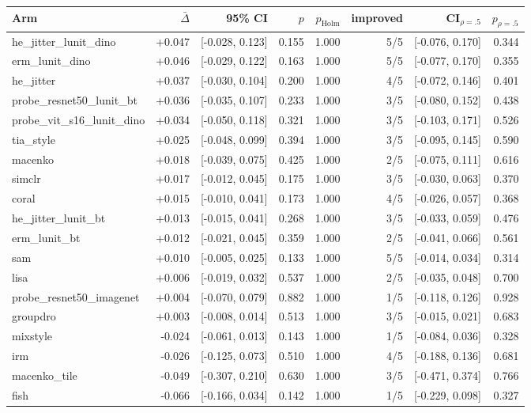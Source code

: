 \begin{tabular}{lrrrrrrr}
\toprule
Arm & $\bar\Delta$ & 95\% CI & $p$ & $p_\text{Holm}$ & improved & CI$_{\rho=.5}$ & $p_{\rho=.5}$ \\
\midrule
he\_jitter\_lunit\_dino & +0.047 & [-0.028, 0.123] & 0.155 & 1.000 & 5/5 & [-0.076, 0.170] & 0.344 \\
erm\_lunit\_dino & +0.046 & [-0.029, 0.122] & 0.163 & 1.000 & 5/5 & [-0.077, 0.170] & 0.355 \\
he\_jitter & +0.037 & [-0.030, 0.104] & 0.200 & 1.000 & 4/5 & [-0.072, 0.146] & 0.401 \\
probe\_resnet50\_lunit\_bt & +0.036 & [-0.035, 0.107] & 0.233 & 1.000 & 3/5 & [-0.080, 0.152] & 0.438 \\
probe\_vit\_s16\_lunit\_dino & +0.034 & [-0.050, 0.118] & 0.321 & 1.000 & 3/5 & [-0.103, 0.171] & 0.526 \\
tia\_style & +0.025 & [-0.048, 0.099] & 0.394 & 1.000 & 3/5 & [-0.095, 0.145] & 0.590 \\
macenko & +0.018 & [-0.039, 0.075] & 0.425 & 1.000 & 2/5 & [-0.075, 0.111] & 0.616 \\
simclr & +0.017 & [-0.012, 0.045] & 0.175 & 1.000 & 3/5 & [-0.030, 0.063] & 0.370 \\
coral & +0.015 & [-0.010, 0.041] & 0.173 & 1.000 & 4/5 & [-0.026, 0.057] & 0.368 \\
he\_jitter\_lunit\_bt & +0.013 & [-0.015, 0.041] & 0.268 & 1.000 & 3/5 & [-0.033, 0.059] & 0.476 \\
erm\_lunit\_bt & +0.012 & [-0.021, 0.045] & 0.359 & 1.000 & 2/5 & [-0.041, 0.066] & 0.561 \\
sam & +0.010 & [-0.005, 0.025] & 0.133 & 1.000 & 5/5 & [-0.014, 0.034] & 0.314 \\
lisa & +0.006 & [-0.019, 0.032] & 0.537 & 1.000 & 2/5 & [-0.035, 0.048] & 0.700 \\
probe\_resnet50\_imagenet & +0.004 & [-0.070, 0.079] & 0.882 & 1.000 & 1/5 & [-0.118, 0.126] & 0.928 \\
groupdro & +0.003 & [-0.008, 0.014] & 0.513 & 1.000 & 3/5 & [-0.015, 0.021] & 0.683 \\
mixstyle & -0.024 & [-0.061, 0.013] & 0.143 & 1.000 & 1/5 & [-0.084, 0.036] & 0.328 \\
irm & -0.026 & [-0.125, 0.073] & 0.510 & 1.000 & 4/5 & [-0.188, 0.136] & 0.681 \\
macenko\_tile & -0.049 & [-0.307, 0.210] & 0.630 & 1.000 & 3/5 & [-0.471, 0.374] & 0.766 \\
fish & -0.066 & [-0.166, 0.034] & 0.142 & 1.000 & 1/5 & [-0.229, 0.098] & 0.327 \\
\bottomrule
\end{tabular}
